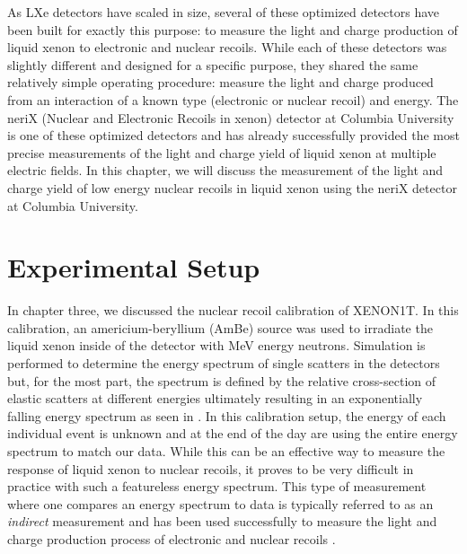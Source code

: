 As LXe detectors have scaled in size, several of these optimized detectors have been built for exactly this purpose: to measure the light and charge production of liquid xenon to electronic and nuclear recoils.  While each of these detectors was slightly different and designed for a specific purpose, they shared the same relatively simple operating procedure: measure the light and charge produced from an interaction of a known type (electronic or nuclear recoil) and energy.  The neriX (Nuclear and Electronic Recoils in xenon) detector at Columbia University is one of these optimized detectors and has already successfully provided the most precise measurements of the light and charge yield of liquid xenon at multiple electric fields.  In this chapter, we will discuss the measurement of the light and charge yield of low energy nuclear recoils in liquid xenon using the neriX detector at Columbia University.

\section{Experimental Setup}

In chapter three, we discussed the nuclear recoil calibration of XENON1T.  In this calibration, an americium-beryllium (AmBe) source was used to irradiate the liquid xenon inside of the detector with MeV energy neutrons.  Simulation is performed to determine the energy spectrum of single scatters in the detectors but, for the most part, the spectrum is defined by the relative cross-section of elastic scatters at different energies ultimately resulting in an exponentially falling energy spectrum as seen in .  In this calibration setup, the energy of each individual event is unknown and at the end of the day are using the entire energy spectrum to match our data.  While this can be an effective way to measure the response of liquid xenon to nuclear recoils, it proves to be very difficult in practice with such a featureless energy spectrum.  This type of measurement where one compares an energy spectrum to data is typically referred to as an \textit{indirect} measurement and has been used successfully to measure the light and charge production process of electronic and nuclear recoils \cite{aprile2013response, akerib2016tritium, aprile2017tritium}.


